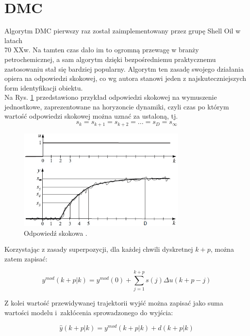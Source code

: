 \section{DMC}
Algorytm DMC pierwszy raz został zaimplementowany przez grupę Shell Oil w latach \\ 70 XXw. Na tamten czas dało im to ogromną przewagę w branży petrochemicznej, a sam algorytm dzięki bezpośredniemu praktycznemu zastosowaniu stał się bardziej popularny. Algorytm ten zasadę swojego działania opiera na odpowiedzi skokowej, co wg autora \cite{120} stanowi jeden z najskuteczniejszych form identyfikacji obiektu. \\
Na Rys. \ref{step_response} przedstawiono przykład odpowiedzi skokowej na wymuszenie jednostkowe, zaprezentowane na horyzoncie dynamiki, czyli czas po którym wartość odpowiedzi skokowej można uznać za ustaloną, tj.
\begin{equation}
s_k = s_{k+1} = s_{k+2} = ... = s_D = s_{\infty}
\end{equation} 

\begin{figure}[h!]
\centering
\includegraphics[width=0.75\textwidth]{pictures/step_response}
\caption{Odpowiedź skokowa \cite{123}.}
\label{step_response}
\end{figure}

Korzystając z zasady superpozycji, dla każdej chwili dyskretnej $k+p$, można zatem zapisać:

\begin{equation}
y^{mod}(k+p|k) = y^{mod}(0) + \sum_{j=1}^{k+p} s(j) \Delta u(k+p-j)
\end{equation}

\newpage

Z kolei wartość przewidywanej trajektorii wyjść można zapisać jako suma wartości modelu i~zakłócenia sprowadzonego do wyjścia:

\begin{equation}
\hat{y}(k+p|k) = y^{mod}(k+p|k) + d(k+p|k)
\end{equation} 

